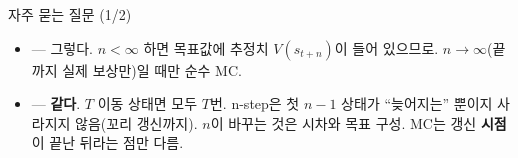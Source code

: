 \begin{frame}{자주 묻는 질문 (1/2)}
  \begin{itemize}
    \item {} --- 그렇다. $n < \infty$
      하면 목표값에 추정치 $V(s_{t+n})$이 들어 있으므로.
      $n\to\infty$(끝까지 실제 보상만)일 때만 순수 MC.
    \item {} --- \textbf{같다}.
      $T$ 이동 상태면 모두 $T$번. n-step은 첫 $n-1$ 상태가 ``늦어지는''
      뿐이지 사라지지 않음(꼬리 갱신까지). $n$이 바꾸는 것은 시차와
      목표 구성. MC는 갱신 \textbf{시점}이 끝난 뒤라는 점만 다름.
  \end{itemize}
\end{frame}
